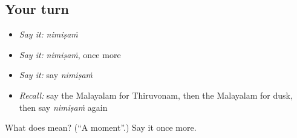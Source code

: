 \subsection*{Your turn}
\begin{itemize}
\raggedright
  \item \emph{Say it:} \emph{nimiṣaṁ}
  \item \emph{Say it:} \emph{nimiṣaṁ}, once more
  \item \emph{Say it:} say \emph{nimiṣaṁ}
  \item \emph{Recall:} say the Malayalam for Thiruvonam, then the Malayalam for dusk, then say \emph{nimiṣaṁ} again
\end{itemize}

\begin{tcolorbox}[breakable,colback=teal!4,colframe=teal!35!black,title={Before you move on}]
What does  mean? (\textquotedblleft{}A moment\textquotedblright{}.) Say it once more.
\end{tcolorbox}
